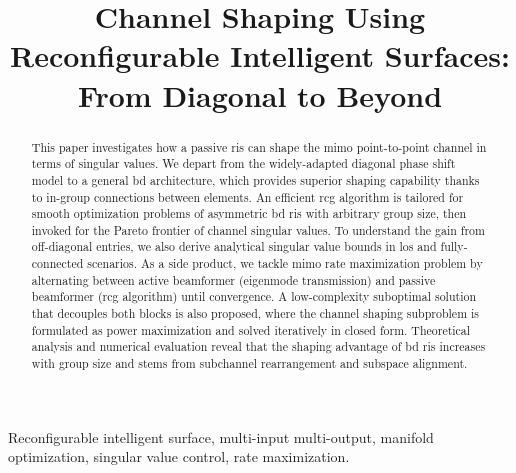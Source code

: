 \documentclass[journal]{IEEEtran}
\begin{document}
\title{Channel Shaping Using Reconfigurable Intelligent Surfaces: From Diagonal to Beyond}
\author{
}
\maketitle

\begin{abstract}
	This paper investigates how a passive \gls{ris} can shape the \gls{mimo} point-to-point channel in terms of singular values.
	We depart from the widely-adapted diagonal phase shift model to a general \gls{bd} architecture, which provides superior shaping capability thanks to in-group connections between elements.
	An efficient \gls{rcg} algorithm is tailored for smooth optimization problems of asymmetric \gls{bd} \gls{ris} with arbitrary group size, then invoked for the Pareto frontier of channel singular values.
	To understand the gain from off-diagonal entries, we also derive analytical singular value bounds in \gls{los} and fully-connected scenarios.
	As a side product, we tackle \gls{mimo} rate maximization problem by alternating between active beamformer (eigenmode transmission) and passive beamformer (\gls{rcg} algorithm) until convergence.
	A low-complexity suboptimal solution that decouples both blocks is also proposed, where the channel shaping subproblem is formulated as power maximization and solved iteratively in closed form.
	Theoretical analysis and numerical evaluation reveal that the shaping advantage of \gls{bd} \gls{ris} increases with group size and stems from subchannel rearrangement and subspace alignment.
\end{abstract}

\begin{IEEEkeywords}
	Reconfigurable intelligent surface, multi-input multi-output, manifold optimization, singular value control, rate maximization.
\end{IEEEkeywords}

\glsresetall
\end{document}
